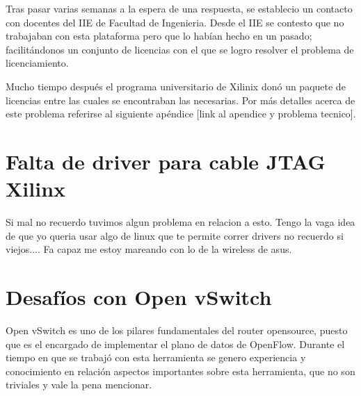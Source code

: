 Tras pasar varias semanas a la espera de una respuesta, se establecio un contacto con docentes del IIE de Facultad de Ingenieria. Desde el IIE se contesto que no trabajaban con esta plataforma pero que lo hab\'ian hecho en un pasado; facilit\'andonos un conjunto de licencias con el que se logro resolver el problema de licenciamiento. 

Mucho tiempo despu\'es el programa universitario de Xilinix don\'o un paquete de licencias entre las cuales se encontraban las necesarias. Por m\'as detalles acerca de este problema referirse al siguiente ap\'endice [link al apendice y problema tecnico].

\section{Falta de driver para cable JTAG Xilinx}
Si mal no recuerdo tuvimos algun problema en relacion a esto. Tengo la vaga idea de que yo queria usar algo de linux que te permite correr drivers no recuerdo si viejos.... Fa capaz me estoy mareando con lo de la wireless de asus.

\section{Desaf\'ios con Open vSwitch}
\label{apendiceB5}

Open vSwitch es uno de los pilares fundamentales del router opensource, puesto que es el encargado de implementar el plano de datos de OpenFlow. Durante el tiempo en que se trabaj\'o con esta herramienta se genero experiencia y conocimiento en relaci\'on aspectos importantes sobre esta herramienta, que no son triviales y vale la pena mencionar.\\ 

